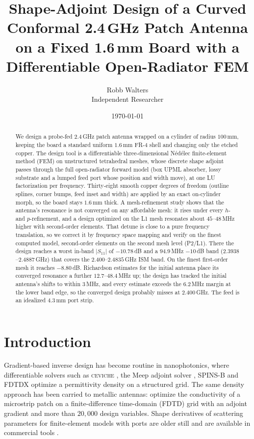 \documentclass{anvil-paper}
\title{Shape-Adjoint Design of a Curved Conformal 2.4\,GHz Patch Antenna
on a Fixed 1.6\,mm Board with a Differentiable Open-Radiator FEM}
\author{Robb Walters\\
  {\normalsize Independent Researcher}}
\date{\today}
\newcommand{\PL}{P2/L1}
\begin{document}
\maketitle

\begin{abstract}
We design a probe-fed 2.4\,GHz patch antenna wrapped on a cylinder of
radius $100$\,mm, keeping the board a standard uniform $1.6$\,mm FR-4
shell and changing only the etched copper. The design tool is a
differentiable three-dimensional N\'ed\'elec finite-element method (FEM)
on unstructured tetrahedral meshes, whose discrete shape adjoint passes
through the full open-radiator forward model (box UPML absorber, lossy
substrate and a lumped feed port whose position and width move), at one
LU factorization per frequency. Thirty-eight smooth copper degrees of
freedom (outline splines, corner bumps, feed inset and width) are applied
by an exact on-cylinder morph, so the board stays $1.6$\,mm thick. A
mesh-refinement study shows that the antenna's resonance is not converged
on any affordable mesh: it rises under every $h$- and $p$-refinement, and
a design optimized on the L1 mesh resonates about $45$--$48$\,MHz higher
with second-order elements. That detune is close to a pure frequency
translation, so we correct it by frequency space mapping and verify on
the finest computed model, second-order elements on the second mesh level
(\PL). There the design reaches a worst in-band $|S_{11}|$ of
$-10.78$\,dB and a $94.9$\,MHz $-10$\,dB band ($2.3938$--$2.4887$\,GHz)
that covers the $2.400$--$2.4835$\,GHz ISM band. On the finest
first-order mesh it reaches $-8.80$\,dB. Richardson estimates for the initial antenna
place its converged resonance a further $12.7$--$48.4$\,MHz up; the design
has tracked the initial antenna's shifts to within $3$\,MHz, and every
estimate exceeds the $6.2$\,MHz margin at the lower band edge, so the
converged design probably misses at $2.400$\,GHz. The feed is an idealized $4.3$\,mm port strip.
\end{abstract}

\section{Introduction}
\label{sec:intro}

Gradient-based inverse design has become routine in nanophotonics, where
differentiable solvers such as \textsc{ceviche} \citep{hughes2019forward},
the Meep adjoint solver \citep{hammond2022meepadjoint}, SPINS-B
\citep{su_spinsb} and FDTDX \citep{mahlau2026fdtdx} optimize a permittivity
density on a structured grid. The same density approach has been carried
to metallic antennas: \citet{hassan2014topology} optimize the conductivity
of a microstrip patch on a finite-difference time-domain (FDTD) grid with an
adjoint gradient and more than $20{,}000$ design variables. Shape
derivatives of scattering parameters for finite-element models with ports
are older still \citep{webb2000design,webb2002design,nikolova2004adjoint}
and are available in commercial tools
\citep{ansys_hfss_derivatives,comsol_sensitivity_method}.
\end{document}
